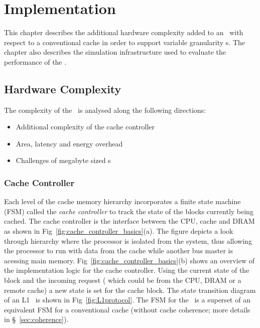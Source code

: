 
%
%

\chapter{Implementation}
\label{chap:hardware_complexity_and_simulation}

This chapter describes the additional hardware complexity added to an \AC\ with respect to a conventional cache in order to support variable granularity \AB{}s. The chapter also describes the simulation infrastructure used to evaluate the performance of the \AC{}.

\section{Hardware Complexity}  
\label{sec:hardware_complexity}

The complexity of the \AC\ is analysed along the following directions:
\begin{itemize}
  \item Additional complexity of the cache controller
  \item Area, latency and energy overhead
  \item Challenges of megabyte sized \AC{}s
\end{itemize}


\subsection{Cache Controller} 

Each level of the cache memory hierarchy incorporates a finite state machine (FSM) called the \textit{cache controller} to track the state of the blocks currently being cached. The cache controller is the interface between the CPU, cache and DRAM as shown in Fig~\ref{fig:cache_controller_basics}(a). The figure depicts a look through hierarchy where the processor is isolated from the system, thus allowing the processor to run with data from the cache while another bus master is acessing main memory. Fig~\ref{fig:cache_controller_basics}(b) shows an overview of the implementation logic for the cache controller. Using the current state of the block and the incoming request ( which could be from the CPU, DRAM or a remote cache) a new state is set for the cache block. The state transition diagram of an L1 \AC\ is shown in Fig~\ref{fig:L1protocol}. The FSM for the \AC\ is a superset of an equivalent FSM for a conventional cache (without cache coherence; more details in \S~\ref{sec:coherence}).

